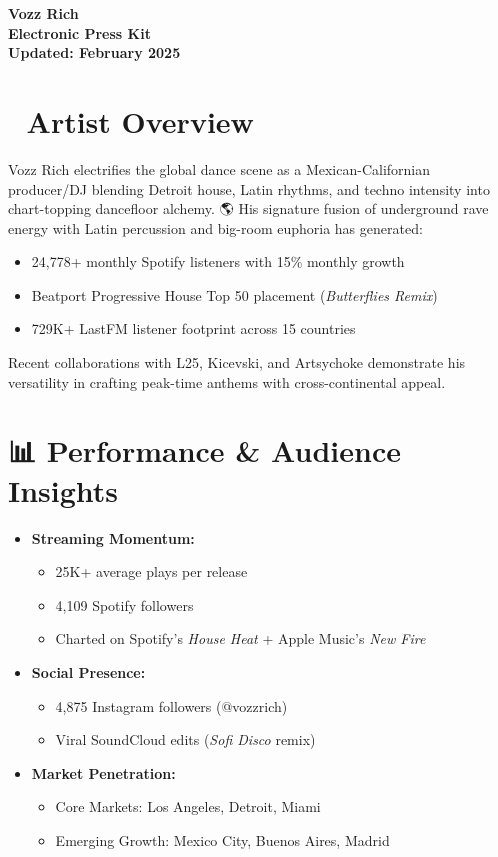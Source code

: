 \documentclass{article}
\newcommand{\sectionrule}{\par\noindent{\color{secondary!30}\rule{\textwidth}{0.5pt}}\vspace{-1em}}
\newcommand{\subsectionrule}{\par\noindent{\color{secondary!15}\rule{\textwidth}{0.5pt}}\vspace{-1em}}
\begin{document}
\begin{center}
\Huge\bfseries\color{primary}Vozz Rich\\[0.2em]
\Large Electronic Press Kit\\[0.5em]
\small\color{secondary}Updated: February 2025
\end{center}
\sectionrule

\section*{\color{primary}🎤 Artist Overview}
\subsectionrule
Vozz Rich electrifies the global dance scene as a Mexican-Californian producer/DJ blending Detroit house, Latin rhythms, and techno intensity into chart-topping dancefloor alchemy. 🌎 His signature fusion of underground rave energy with Latin percussion and big-room euphoria has generated:
\begin{itemize}
\item 24,778+ monthly Spotify listeners with 15\% monthly growth
\item Beatport Progressive House Top 50 placement (\textit{Butterflies Remix})
\item 729K+ LastFM listener footprint across 15 countries
\end{itemize}
Recent collaborations with L25, Kicevski, and Artsychoke demonstrate his versatility in crafting peak-time anthems with cross-continental appeal.

\section*{\color{primary}📊 Performance \& Audience Insights}
\subsectionrule
\begin{itemize}
\item \textbf{Streaming Momentum:}
  \begin{itemize}
  \item 25K+ average plays per release
  \item 4,109 Spotify followers
  \item Charted on Spotify's \textit{House Heat} + Apple Music's \textit{New Fire}
  \end{itemize}
\item \textbf{Social Presence:}
  \begin{itemize}
  \item 4,875 Instagram followers (@vozzrich)
  \item Viral SoundCloud edits (\textit{Sofi Disco} remix)
  \end{itemize}
\item \textbf{Market Penetration:}
  \begin{itemize}
  \item Core Markets: Los Angeles, Detroit, Miami
  \item Emerging Growth: Mexico City, Buenos Aires, Madrid
  \end{itemize}
\end{itemize}
\end{document}
